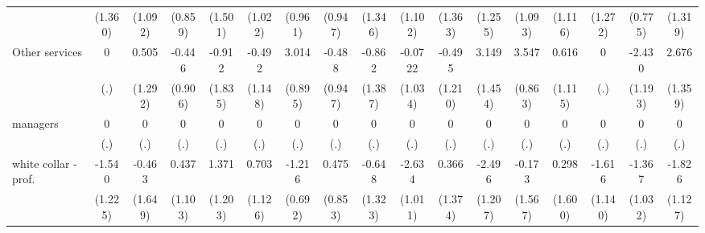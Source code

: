 {\begin{tabular}{l*{16}{c}}
                    &     (1.360)         &     (1.092)         &     (0.859)         &     (1.501)         &     (1.022)         &     (0.961)         &     (0.947)         &     (1.346)         &     (1.102)         &     (1.363)         &     (1.255)         &     (1.093)         &     (1.116)         &     (1.272)         &     (0.775)         &     (1.319)         \\
[1em]
Other services      &           0         &       0.505         &      -0.446         &      -0.912         &      -0.492         &       3.014\sym{***}&      -0.488         &      -0.862         &     -0.0722         &      -0.495         &       3.149\sym{*}  &       3.547\sym{***}&       0.616         &           0         &      -2.430\sym{*}  &       2.676\sym{*}  \\
                    &         (.)         &     (1.292)         &     (0.906)         &     (1.835)         &     (1.148)         &     (0.895)         &     (0.947)         &     (1.387)         &     (1.034)         &     (1.210)         &     (1.454)         &     (0.863)         &     (1.115)         &         (.)         &     (1.193)         &     (1.359)         \\
[1em]
managers            &           0         &           0         &           0         &           0         &           0         &           0         &           0         &           0         &           0         &           0         &           0         &           0         &           0         &           0         &           0         &           0         \\
                    &         (.)         &         (.)         &         (.)         &         (.)         &         (.)         &         (.)         &         (.)         &         (.)         &         (.)         &         (.)         &         (.)         &         (.)         &         (.)         &         (.)         &         (.)         &         (.)         \\
[1em]
white collar - prof.&      -1.540         &      -0.463         &       0.437         &       1.371         &       0.703         &      -1.216         &       0.475         &      -0.648         &      -2.634\sym{**} &       0.366         &      -2.496\sym{*}  &      -0.173         &       0.298         &      -1.616         &      -1.367         &      -1.826         \\
                    &     (1.225)         &     (1.649)         &     (1.103)         &     (1.203)         &     (1.126)         &     (0.692)         &     (0.853)         &     (1.323)         &     (1.011)         &     (1.374)         &     (1.207)         &     (1.567)         &     (1.600)         &     (1.140)         &     (1.032)         &     (1.127)         \\

\end{tabular}}
